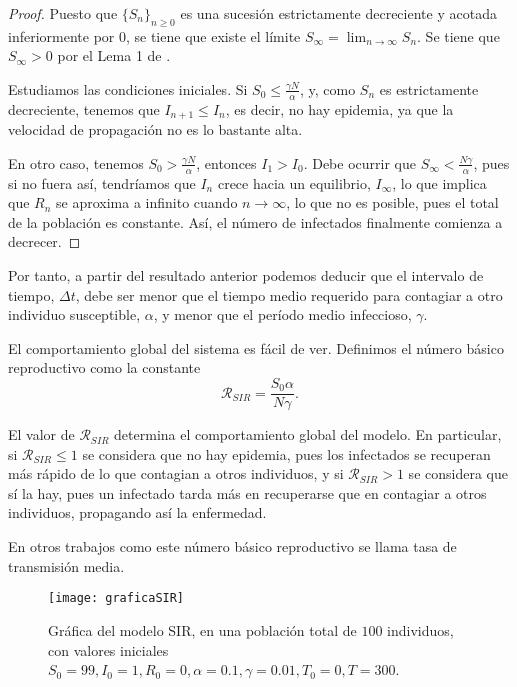 \begin{proof}

Puesto que $\{S_n\}_{n\geq 0}$ es una sucesión estrictamente decreciente y acotada inferiormente por $0$, se tiene que existe el límite $\displaystyle S_\infty = \lim_{n \rightarrow \infty} S_n$. Se tiene que $S_\infty > 0$ por el Lema 1 de \cite{allenDiscretetimeSISIR1994}.

Estudiamos las condiciones iniciales. Si $S_0\leq \frac{\gamma N}{\alpha}$, y, como $S_n$ es estrictamente decreciente, tenemos que $I_{n+1}\leq I_n$, es decir, no hay epidemia, ya que la velocidad de propagación no es lo bastante alta.

En otro caso, tenemos $S_0> \frac{\gamma N}{\alpha}$, entonces $I_1>I_0$. Debe ocurrir que $S_\infty <\frac{N\gamma}{\alpha}$, pues si no fuera así, tendríamos que $I_n$ crece hacia un equilibrio, $I_\infty$, lo que implica que $R_n$ se aproxima a infinito cuando $n\rightarrow\infty$, lo que no es posible, pues el total de la población es constante. Así, el número de infectados finalmente comienza a decrecer.
\end{proof}

Por tanto, a partir del resultado anterior podemos deducir que el intervalo de tiempo, $\Delta t$, debe ser menor que el tiempo medio requerido para contagiar a otro individuo susceptible, $\alpha$, y menor que el período medio infeccioso, $\gamma$.


El comportamiento global del sistema es fácil de ver. Definimos el número básico reproductivo como la constante 
$$\mathcal{R}_{SIR}=\frac{S_0 \alpha}{N\gamma }.$$

El valor de $\mathcal{R}_{SIR}$ determina el comportamiento global del modelo. En particular, si $\mathcal{R}_{SIR}\leq 1$ se considera que no hay epidemia, pues los infectados se recuperan más rápido de lo que contagian a otros individuos, y si $\mathcal{R}_{SIR}>1$ se considera que sí la hay, pues un infectado tarda más en recuperarse que en contagiar a otros individuos, propagando así la enfermedad.

En otros trabajos como \cite{demongeotSIEpidemicModel} este número básico reproductivo se llama tasa de transmisión media.



\begin{figure}
\begin{center}
\caption{Gráfica del modelo SIR, en una población total de $100$ individuos, con valores iniciales $S_0=99, I_0 = 1, R_0 = 0, \alpha = 0.1, \gamma = 0.01, T_0 = 0, T = 300$.}
\texttt{[image: graficaSIR]}
\end{center}
\end{figure}

